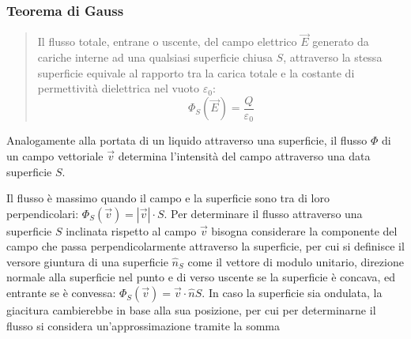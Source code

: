 \documentclass{article}
\numberwithin{equation}{subsection}
\begin{document}
\subsubsection{Teorema di Gauss}

\begin{quotation}
    Il flusso totale, entrane o uscente, del campo elettrico $\vec{E}$ generato da cariche interne ad una qualsiasi superficie chiusa $S$, attraverso 
    la stessa superficie equivale al rapporto tra la carica totale e la costante di permettività dielettrica nel vuoto $\varepsilon_0$:
    \begin{equation}
        \Phi_{S}(\vec{E})=\displaystyle\frac{Q}{\varepsilon_0}
    \end{equation}
\end{quotation}


Analogamente alla portata di un liquido attraverso una superficie, il flusso $\Phi$ di un campo vettoriale $\vec{v}$ determina l'intensità del campo attraverso una data superficie $S$. 
\begin{center}
\end{center}
Il flusso è massimo quando il campo e la superficie sono tra di loro perpendicolari: $\Phi_S(\vec{v})=|\vec{v}|\cdot S$. Per determinare il flusso attraverso una superficie $S$ 
inclinata rispetto al campo $\vec{v}$ bisogna considerare la componente del campo che passa perpendicolarmente attraverso la superficie, per cui si definisce il versore 
giuntura di una superficie $\hat{n}_S$ come il vettore di modulo unitario, direzione normale alla superficie nel punto e di verso uscente se la superficie è concava, ed 
entrante se è convessa: $\Phi_S(\vec{v})=\vec{v}\cdot\hat{n}S$. 
In caso la superficie sia ondulata, la giacitura cambierebbe in base alla sua posizione, per cui per determinarne il flusso si considera un'approssimazione tramite la somma 
\end{document}
